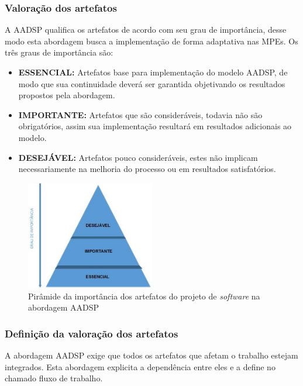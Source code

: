 \documentclass{acm_proc_article-sp}
\begin{document}
\subsubsection*{Valoração dos artefatos}
A AADSP qualifica os artefatos de acordo com seu grau de importância, desse modo esta abordagem busca a implementação de forma adaptativa nas MPEs. Os três graus de importância são:

\begin{itemize}
\item \textbf{ESSENCIAL:} Artefatos base para implementação do modelo AADSP, de modo que sua continuidade deverá ser garantida objetivando os resultados propostos pela abordagem\cite{aadsp:hibirdo}.
\item \textbf{IMPORTANTE:} Artefatos que são consideráveis, todavia não são obrigatórios, assim sua implementação resultará em resultados adicionais ao modelo\cite{aadsp:hibirdo}.
\item \textbf{DESEJÁVEL:} Artefatos pouco consideráveis, estes não implicam necessariamente na melhoria do processo ou em resultados satisfatórios\cite{aadsp:hibirdo}.
\end{itemize}

\begin{figure}[h]
\centering %
\includegraphics[width=0.5\textwidth]{AADSP_Piramidade_de_importancia_dos_artefatos.jpg} %
\caption{Pirâmide da importância dos artefatos do projeto de \textit{software} na abordagem AADSP  \cite{aadsp:hibirdo}}
\end{figure}

\subsubsection*{Definição da valoração dos artefatos}
A abordagem AADSP  exige que todos os artefatos que afetam o trabalho estejam integrados. Esta abordagem explicita a dependência entre eles e a define no chamado fluxo de trabalho\cite{aadsp:hibirdo}.
\end{document}
